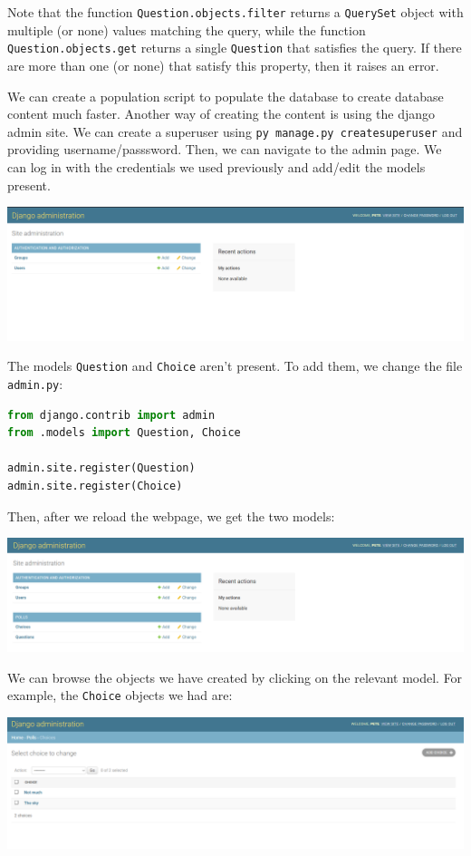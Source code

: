 \documentclass[a4paper, openany]{memoir}
\begin{document}
    Note that the function \texttt{Question.objects.filter} returns a \texttt{QuerySet} object with multiple (or none) values matching the query, while the function \newline \texttt{Question.objects.get} returns a single \texttt{Question} that satisfies the query. If there are more than one (or none) that satisfy this property, then it raises an error.

    We can create a population script to populate the database to create database content much faster. Another way of creating the content is using the django admin site. We can create a superuser using \texttt{py manage.py createsuperuser} and providing username/passsword. Then, we can navigate to the admin page. We can log in with the credentials we used previously and add/edit the models present.
    \begin{center}
        \includegraphics[scale=0.3]{src/Django3.PNG}
    \end{center}
    The models \texttt{Question} and \texttt{Choice} aren't present. To add them, we change the file \texttt{admin.py}:
\begin{lstlisting}[language=python]
from django.contrib import admin
from .models import Question, Choice

admin.site.register(Question)
admin.site.register(Choice)
\end{lstlisting}
    Then, after we reload the webpage, we get the two models:
    \begin{center}
        \includegraphics[scale=0.3]{src/Django4.PNG}
    \end{center}
    We can browse the objects we have created by clicking on the relevant model. For example, the \texttt{Choice} objects we had are:
    \begin{center}
        \includegraphics[scale=0.3]{src/Django5.PNG}
    \end{center}
\end{document}
